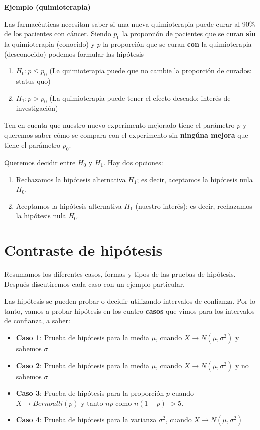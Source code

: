 \documentclass[
]{book}
\providecommand{\tightlist}{%
  \setlength{\itemsep}{0pt}\setlength{\parskip}{0pt}}
\begin{document}
\textbf{Ejemplo (quimioterapia)}

Las farmacéuticas necesitan saber si una nueva quimioterapia puede curar al 90\% de los pacientes con cáncer. Siendo \(p_0\) la proporción de pacientes que se curan \textbf{sin} la quimioterapia (conocido) y \(p\) la proporción que se curan \textbf{con} la quimioterapia (desconocido) podemos formular las hipótesis

\begin{enumerate}
\def\labelenumi{\alph{enumi}.}
\tightlist
\item
  \(H_0:p \leq p_0\) (La quimioterapia puede que no cambie la proporción de curados: status quo)
\item
  \(H_1: p > p_0\) (La quimioterapia puede tener el efecto deseado: interés de investigación)
\end{enumerate}

Ten en cuenta que nuestro nuevo experimento mejorado tiene el parámetro \(p\) y queremos saber cómo se compara con el experimento sin \textbf{ningúna mejora} que tiene el parámetro \(p_0\).

Queremos decidir entre \(H_0\) y \(H_1\). Hay dos opciones:

\begin{enumerate}
\def\labelenumi{\arabic{enumi}.}
\item
  Rechazamos la hipótesis alternativa \(H_1\); es decir, aceptamos la hipótesis nula \(H_0\).
\item
  Aceptamos la hipótesis alternativa \(H_1\) (nuestro interés); es decir, rechazamos la hipótesis nula \(H_0\).
\end{enumerate}

\hypertarget{contraste-de-hipuxf3tesis-1}{%
\section{Contraste de hipótesis}\label{contraste-de-hipuxf3tesis-1}}

Resumamos los diferentes casos, formas y tipos de las pruebas de hipótesis. Después discutiremos cada caso con un ejemplo particular.

Las hipótesis se pueden probar o decidir utilizando intervalos de confianza. Por lo tanto, vamos a probar hipótesis en los cuatro \textbf{casos} que vimos para los intervalos de confianza, a saber:

\begin{itemize}
\item
  \textbf{Caso 1}: Prueba de hipótesis para la media \(\mu\), cuando \(X \rightarrow N(\mu, \sigma^2)\) y sabemos \(\sigma\)
\item
  \textbf{Caso 2}: Prueba de hipótesis para la media \(\mu\), cuando \(X \rightarrow N(\mu, \sigma^2)\) y no sabemos \(\sigma\)
\item
  \textbf{Caso 3}: Prueba de hipótesis para la proporción \(p\) cuando \(X \rightarrow Bernoulli(p)\) y tanto \(np\) como \(n(1-p)\) \(> 5\).
\item
  \textbf{Caso 4}: Prueba de hipótesis para la varianza \(\sigma^2\), cuando \(X \rightarrow N(\mu, \sigma^2)\)
\end{itemize}
\end{document}
